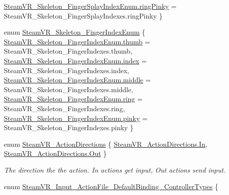 \begin{DoxyCompactItemize}
\mbox{\hyperlink{namespace_valve_1_1_v_r_a43c97e13fe46f0575986b9f74945e0bfaf96fc90618b55f0db607eb304b65e285}{Steam\+V\+R\+\_\+\+Skeleton\+\_\+\+Finger\+Splay\+Index\+Enum.\+ring\+Pinky}} = Steam\+V\+R\+\_\+\+Skeleton\+\_\+\+Finger\+Splay\+Indexes.\+ring\+Pinky
 \}
\item 
enum \mbox{\hyperlink{namespace_valve_1_1_v_r_ac40c4bdf0a3dcd6e69cad2d85f287c67}{Steam\+V\+R\+\_\+\+Skeleton\+\_\+\+Finger\+Index\+Enum}} \{ \newline
\mbox{\hyperlink{namespace_valve_1_1_v_r_ac40c4bdf0a3dcd6e69cad2d85f287c67af12105146129696d6a7e0ed521db2e48}{Steam\+V\+R\+\_\+\+Skeleton\+\_\+\+Finger\+Index\+Enum.\+thumb}} = Steam\+V\+R\+\_\+\+Skeleton\+\_\+\+Finger\+Indexes.\+thumb, 
\mbox{\hyperlink{namespace_valve_1_1_v_r_ac40c4bdf0a3dcd6e69cad2d85f287c67a6a992d5529f459a44fee58c733255e86}{Steam\+V\+R\+\_\+\+Skeleton\+\_\+\+Finger\+Index\+Enum.\+index}} = Steam\+V\+R\+\_\+\+Skeleton\+\_\+\+Finger\+Indexes.\+index, 
\mbox{\hyperlink{namespace_valve_1_1_v_r_ac40c4bdf0a3dcd6e69cad2d85f287c67a4a548addbfb239bbd12f5afe11a4b6dc}{Steam\+V\+R\+\_\+\+Skeleton\+\_\+\+Finger\+Index\+Enum.\+middle}} = Steam\+V\+R\+\_\+\+Skeleton\+\_\+\+Finger\+Indexes.\+middle, 
\mbox{\hyperlink{namespace_valve_1_1_v_r_ac40c4bdf0a3dcd6e69cad2d85f287c67a1a5df958e0f29d35594c7cf057fe4bd1}{Steam\+V\+R\+\_\+\+Skeleton\+\_\+\+Finger\+Index\+Enum.\+ring}} = Steam\+V\+R\+\_\+\+Skeleton\+\_\+\+Finger\+Indexes.\+ring, 
\newline
\mbox{\hyperlink{namespace_valve_1_1_v_r_ac40c4bdf0a3dcd6e69cad2d85f287c67adaea4d0b55ef6c16f04b8997a51e7e6a}{Steam\+V\+R\+\_\+\+Skeleton\+\_\+\+Finger\+Index\+Enum.\+pinky}} = Steam\+V\+R\+\_\+\+Skeleton\+\_\+\+Finger\+Indexes.\+pinky
 \}
\item 
enum \mbox{\hyperlink{namespace_valve_1_1_v_r_a1e6192cb5ddaf204afab87ccb5728780}{Steam\+V\+R\+\_\+\+Action\+Directions}} \{ \mbox{\hyperlink{namespace_valve_1_1_v_r_a1e6192cb5ddaf204afab87ccb5728780aefeb369cccbd560588a756610865664c}{Steam\+V\+R\+\_\+\+Action\+Directions.\+In}}, 
\mbox{\hyperlink{namespace_valve_1_1_v_r_a1e6192cb5ddaf204afab87ccb5728780a7c147cda9e49590f6abe83d118b7353b}{Steam\+V\+R\+\_\+\+Action\+Directions.\+Out}}
 \}
\begin{DoxyCompactList}\small\item\em The direction the the action. In actions get input, Out actions send input. \end{DoxyCompactList}\item 
enum \mbox{\hyperlink{namespace_valve_1_1_v_r_a040b1a3a09cfc50936767d92db7cae61}{Steam\+V\+R\+\_\+\+Input\+\_\+\+Action\+File\+\_\+\+Default\+Binding\+\_\+\+Controller\+Types}} \{ \newline

\end{DoxyCompactItemize}
